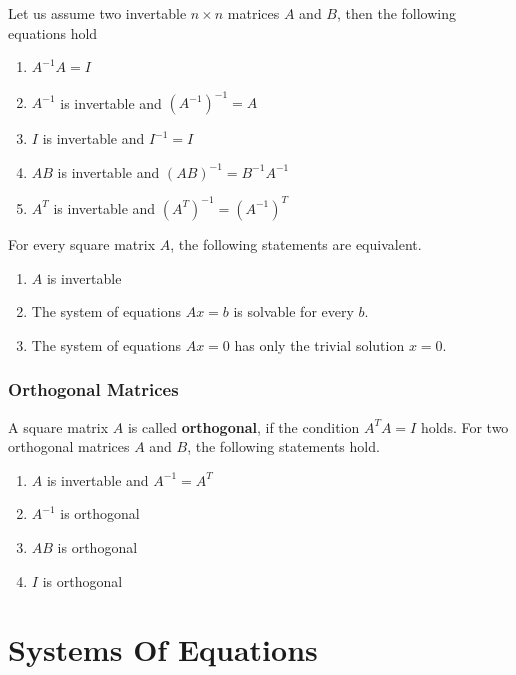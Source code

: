 \documentclass[
]{book}
\providecommand{\tightlist}{%
  \setlength{\itemsep}{0pt}\setlength{\parskip}{0pt}}
\theoremstyle{definition}
\theoremstyle{definition}
\theoremstyle{definition}
\theoremstyle{remark}
\begin{document}
Let us assume two invertable \(n\times n\) matrices \(A\) and \(B\), then the following equations hold

\begin{enumerate}
\def\labelenumi{\arabic{enumi}.}
\tightlist
\item
  \(A^{-1}A = I\)
\item
  \(A^{-1}\) is invertable and \((A^{-1})^{-1} = A\)
\item
  \(I\) is invertable and \(I^{-1} = I\)
\item
  \(AB\) is invertable and \((AB)^{-1} = B^{-1}A^{-1}\)
\item
  \(A^T\) is invertable and \((A^T)^{-1} = (A^{-1})^T\)
\end{enumerate}

For every square matrix \(A\), the following statements are equivalent.

\begin{enumerate}
\def\labelenumi{\arabic{enumi}.}
\tightlist
\item
  \(A\) is invertable
\item
  The system of equations \(Ax = b\) is solvable for every \(b\).
\item
  The system of equations \(Ax = 0\) has only the trivial solution \(x=0\).
\end{enumerate}

\hypertarget{intro-linalg-orthogonal-matrix}{%
\subsubsection{Orthogonal Matrices}\label{intro-linalg-orthogonal-matrix}}

A square matrix \(A\) is called \textbf{orthogonal}, if the condition \(A^TA = I\) holds. For two orthogonal matrices \(A\) and \(B\), the following statements hold.

\begin{enumerate}
\def\labelenumi{\arabic{enumi}.}
\tightlist
\item
  \(A\) is invertable and \(A^{-1} = A^T\)
\item
  \(A^{-1}\) is orthogonal
\item
  \(AB\) is orthogonal
\item
  \(I\) is orthogonal
\end{enumerate}

\hypertarget{intro-linalg-systems-of-equations}{%
\section{Systems Of Equations}\label{intro-linalg-systems-of-equations}}
\end{document}
